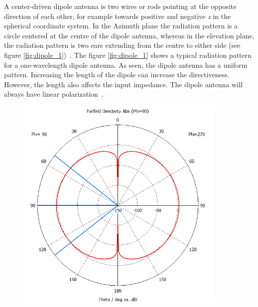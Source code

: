 A center-driven dipole antenna is two wires or rods pointing at the opposite direction of each other, for example towards positive and negative \textit{z} in the spherical coordinate system. In the Azimuth plane the radiation pattern is a circle centered at the centre of the dipole antenna, whereas in the elevation plane, the radiation pattern is two ears extending from the centre to either side (see figure \ref{fig:dipole_1})~\cite[pp. 12-14]{ant_beam_form}. The figure \ref{fig:dipole_1} shows a typical radiation pattern for a one-wavelength dipole antenna. As seen, the dipole antenna has a uniform pattern. Increasing the length of the dipole can increase the directiveness. However, the length also affects the input impedance. The dipole antenna will always have linear polarization~\cite{dipole}. 
\begin{figure}[H]
    \begin{minipage}{0.45\textwidth}
        \centering
        \includegraphics[width=0.9\textwidth]{figures/farfield (f=2.4) dipole.png} %
    \end{minipage}\hfill
    \begin{minipage}{0.45\textwidth}
        \centering

\end{minipage}
\end{figure}
